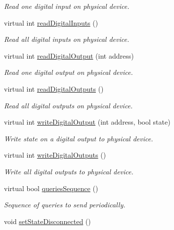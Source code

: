 \begin{DoxyCompactItemize}
\begin{DoxyCompactList}\small\item\em Read one digital input on physical device. \end{DoxyCompactList}\item 
virtual int \hyperlink{classmdt_device_a4f4d18f217aa1cf483027c9b3c0ad09b}{readDigitalInputs} ()
\begin{DoxyCompactList}\small\item\em Read all digital inputs on physical device. \end{DoxyCompactList}\item 
virtual int \hyperlink{classmdt_device_a9d3f57d6022d2554f6f6a9f59a4984c1}{readDigitalOutput} (int address)
\begin{DoxyCompactList}\small\item\em Read one digital output on physical device. \end{DoxyCompactList}\item 
virtual int \hyperlink{classmdt_device_a7cc2f2429776f26f45d42cf49a610958}{readDigitalOutputs} ()
\begin{DoxyCompactList}\small\item\em Read all digital outputs on physical device. \end{DoxyCompactList}\item 
virtual int \hyperlink{classmdt_device_a2a1354e80bd6f3bdca3b68cc0a9a4ea1}{writeDigitalOutput} (int address, bool state)
\begin{DoxyCompactList}\small\item\em Write state on a digital output to physical device. \end{DoxyCompactList}\item 
virtual int \hyperlink{classmdt_device_ad640c81dd966ed31c46d14961fd12830}{writeDigitalOutputs} ()
\begin{DoxyCompactList}\small\item\em Write all digital outputs to physical device. \end{DoxyCompactList}\item 
virtual bool \hyperlink{classmdt_device_acba50968d201ad95c4eaa2ab2ed48b4f}{queriesSequence} ()
\begin{DoxyCompactList}\small\item\em Sequence of queries to send periodically. \end{DoxyCompactList}\item 
void \hyperlink{classmdt_device_ac3df06706c79730fde70ee6131af577c}{setStateDisconnected} ()

\end{DoxyCompactItemize}

